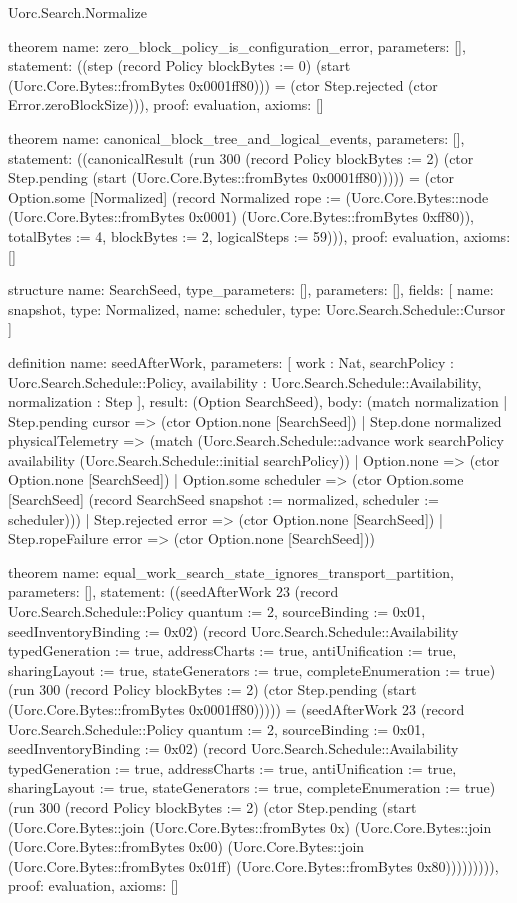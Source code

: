 \begin{lexlean}{Uorc.Search.Normalize}
\begin{semanticmodule}
theorem{
  name: zero_block_policy_is_configuration_error,
  parameters: [],
  statement: ((step (record Policy {blockBytes := 0}) (start (Uorc.Core.Bytes::fromBytes 0x0001ff80))) = (ctor Step.rejected (ctor Error.zeroBlockSize))),
  proof: evaluation{},
  axioms: []
}

theorem{
  name: canonical_block_tree_and_logical_events,
  parameters: [],
  statement: ((canonicalResult (run 300 (record Policy {blockBytes := 2}) (ctor Step.pending (start (Uorc.Core.Bytes::fromBytes 0x0001ff80))))) = (ctor Option.some [Normalized] (record Normalized {rope := (Uorc.Core.Bytes::node (Uorc.Core.Bytes::fromBytes 0x0001) (Uorc.Core.Bytes::fromBytes 0xff80)), totalBytes := 4, blockBytes := 2, logicalSteps := 59}))),
  proof: evaluation{},
  axioms: []
}

structure{
  name: SearchSeed,
  type_parameters: [],
  parameters: [],
  fields: [
    {name: snapshot, type: Normalized},
    {name: scheduler, type: Uorc.Search.Schedule::Cursor}
  ]
}

definition{
  name: seedAfterWork,
  parameters: [
    work : Nat,
    searchPolicy : Uorc.Search.Schedule::Policy,
    availability : Uorc.Search.Schedule::Availability,
    normalization : Step
  ],
  result: (Option SearchSeed),
  body: (match normalization
    | Step.pending cursor => (ctor Option.none [SearchSeed])
    | Step.done normalized physicalTelemetry => (match (Uorc.Search.Schedule::advance work searchPolicy availability (Uorc.Search.Schedule::initial searchPolicy))
      | Option.none => (ctor Option.none [SearchSeed])
      | Option.some scheduler => (ctor Option.some [SearchSeed] (record SearchSeed {snapshot := normalized, scheduler := scheduler})))
    | Step.rejected error => (ctor Option.none [SearchSeed])
    | Step.ropeFailure error => (ctor Option.none [SearchSeed]))
}

theorem{
  name: equal_work_search_state_ignores_transport_partition,
  parameters: [],
  statement: ((seedAfterWork 23 (record Uorc.Search.Schedule::Policy {quantum := 2, sourceBinding := 0x01, seedInventoryBinding := 0x02}) (record Uorc.Search.Schedule::Availability {typedGeneration := true, addressCharts := true, antiUnification := true, sharingLayout := true, stateGenerators := true, completeEnumeration := true}) (run 300 (record Policy {blockBytes := 2}) (ctor Step.pending (start (Uorc.Core.Bytes::fromBytes 0x0001ff80))))) = (seedAfterWork 23 (record Uorc.Search.Schedule::Policy {quantum := 2, sourceBinding := 0x01, seedInventoryBinding := 0x02}) (record Uorc.Search.Schedule::Availability {typedGeneration := true, addressCharts := true, antiUnification := true, sharingLayout := true, stateGenerators := true, completeEnumeration := true}) (run 300 (record Policy {blockBytes := 2}) (ctor Step.pending (start (Uorc.Core.Bytes::join (Uorc.Core.Bytes::fromBytes 0x) (Uorc.Core.Bytes::join (Uorc.Core.Bytes::fromBytes 0x00) (Uorc.Core.Bytes::join (Uorc.Core.Bytes::fromBytes 0x01ff) (Uorc.Core.Bytes::fromBytes 0x80))))))))),
  proof: evaluation{},
  axioms: []
}


\end{semanticmodule}
\end{lexlean}
